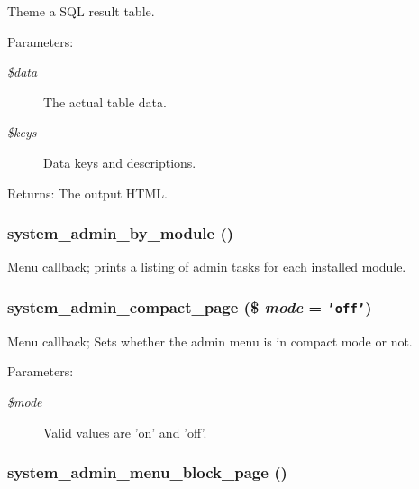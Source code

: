 Theme a SQL result table.

\begin{Desc}
\item[Parameters:]
\begin{description}
\item[{\em \$data}]The actual table data. \item[{\em \$keys}]Data keys and descriptions. \end{description}
\end{Desc}
\begin{Desc}
\item[Returns:]The output HTML. \end{Desc}
\hypertarget{system_8admin_8inc_1f1316cfc11f0f46704c8765a9919c16}{
\subsubsection[{system\_\-admin\_\-by\_\-module}]{\setlength{\rightskip}{0pt plus 5cm}system\_\-admin\_\-by\_\-module ()}}
\label{system_8admin_8inc_1f1316cfc11f0f46704c8765a9919c16}


Menu callback; prints a listing of admin tasks for each installed module. \hypertarget{system_8admin_8inc_b1957cfd893fb50794286ea7c84589e6}{
\subsubsection[{system\_\-admin\_\-compact\_\-page}]{\setlength{\rightskip}{0pt plus 5cm}system\_\-admin\_\-compact\_\-page (\$ {\em mode} = {\tt 'off'})}}
\label{system_8admin_8inc_b1957cfd893fb50794286ea7c84589e6}


Menu callback; Sets whether the admin menu is in compact mode or not.

\begin{Desc}
\item[Parameters:]
\begin{description}
\item[{\em \$mode}]Valid values are 'on' and 'off'. \end{description}
\end{Desc}
\hypertarget{system_8admin_8inc_de03d94c63a6cce2148fc06982f510cb}{
\subsubsection[{system\_\-admin\_\-menu\_\-block\_\-page}]{\setlength{\rightskip}{0pt plus 5cm}system\_\-admin\_\-menu\_\-block\_\-page ()}}
\label{system_8admin_8inc_de03d94c63a6cce2148fc06982f510cb}


